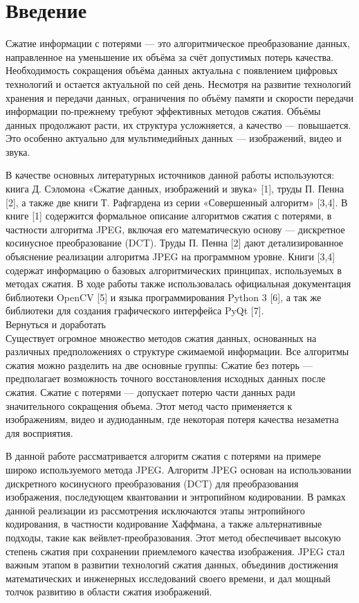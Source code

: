 \section*{Введение}

Сжатие информации с потерями — это алгоритмическое преобразование данных, направленное на уменьшение их объёма за счёт допустимых потерь качества. 
Необходимость сокращения объёма данных актуальна с появлением цифровых технологий и остается актуальной по сей день. 
Несмотря на развитие технологий хранения и передачи данных, ограничения по объёму памяти и скорости передачи информации по-прежнему требуют эффективных методов сжатия. 
Объёмы данных продолжают расти, их структура усложняется, а качество — повышается. 
Это особенно актуально для мультимедийных данных — изображений, видео и звука.

В качестве основных литературных источников данной работы используются: книга Д. Сэломона «Сжатие данных, изображений и звука» [1], труды П. Пенна [2], а также две книги Т. Рафгардена из серии «Совершенный алгоритм» [3,4]. 
В книге [1] содержится формальное описание алгоритмов сжатия с потерями, в частности алгоритма JPEG, включая его математическую основу — дискретное косинусное преобразование (DCT). 
Труды П. Пенна [2] дают детализированное объяснение реализации алгоритма JPEG на программном уровне. 
Книги [3,4] содержат информацию о базовых алгоритмических принципах, используемых в методах сжатия. 
В ходе работы также использовалась официальная документация библиотеки OpenCV [5] и языка программирования Python 3 [6], а так же библиотеки для создания графического интерфейса PyQt [7].
\\

Вернуться и доработать\\

Существует огромное множество методов сжатия данных, основанных на различных предположениях о структуре сжимаемой информации. 
Все алгоритмы сжатия можно разделить на две основные группы:
Сжатие без потерь — предполагает возможность точного восстановления исходных данных после сжатия.
Сжатие с потерями — допускает потерю части данных ради значительного сокращения объема. 
Этот метод часто применяется к изображениям, видео и аудиоданным, где некоторая потеря качества незаметна для восприятия.

В данной работе рассматривается алгоритм сжатия с потерями на примере широко используемого метода JPEG. 
Алгоритм JPEG основан на использовании дискретного косинусного преобразования (DCT) для преобразования изображения, последующем квантовании и энтропийном кодировании. 
В рамках данной реализации из рассмотрения исключаются этапы энтропийного кодирования, в частности кодирование Хаффмана, а также альтернативные подходы, такие как вейвлет-преобразования.
Этот метод обеспечивает высокую степень сжатия при сохранении приемлемого качества изображения. 
JPEG стал важным этапом в развитии технологий сжатия данных, объединив достижения математических и инженерных исследований своего времени, и дал мощный толчок развитию в области сжатия изображений.

